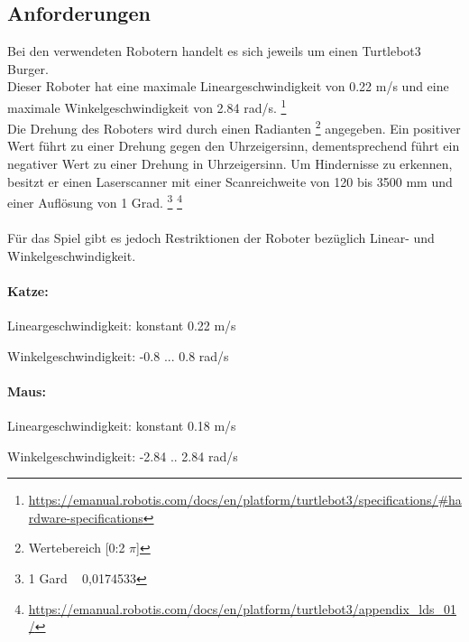 \documentclass[
a4paper,     %
12pt         %
]{scrartcl}  %
\begin{document}
\subsection{Anforderungen}
Bei den verwendeten Robotern handelt es sich jeweils um einen Turtlebot3 Burger.\\ 
Dieser Roboter hat eine maximale Lineargeschwindigkeit von 0.22 m/s und eine maximale Winkelgeschwindigkeit von 2.84 rad/s. \footnote{\url{https://emanual.robotis.com/docs/en/platform/turtlebot3/specifications/\#hardware-specifications}}\\
Die Drehung des Roboters wird durch einen Radianten \footnote {Wertebereich [0:2 $\pi$]} angegeben. Ein positiver Wert führt zu einer Drehung gegen den Uhrzeigersinn, dementsprechend führt ein negativer Wert zu einer Drehung in Uhrzeigersinn.
Um Hindernisse zu erkennen, besitzt er einen Laserscanner mit einer Scanreichweite von 120 bis 3500 mm und einer Auflösung von 1 Grad. \footnote {1 Gard ~ 0,0174533} \footnote{\url{https://emanual.robotis.com/docs/en/platform/turtlebot3/appendix_lds_01/}} 
\\\\
Für das Spiel gibt es jedoch Restriktionen der Roboter bezüglich Linear- und Winkelgeschwindigkeit.\\
\paragraph{Katze:}
\begin{description}
 \item Lineargeschwindigkeit: konstant 0.22 m/s
 \item Winkelgeschwindigkeit: -0.8 ... 0.8 rad/s
\end{description}    
\paragraph{Maus:}
\begin{description}
 \item Lineargeschwindigkeit: konstant 0.18 m/s
 \item Winkelgeschwindigkeit: -2.84 .. 2.84 rad/s
\end{description}
\clearpage
\end{document}
